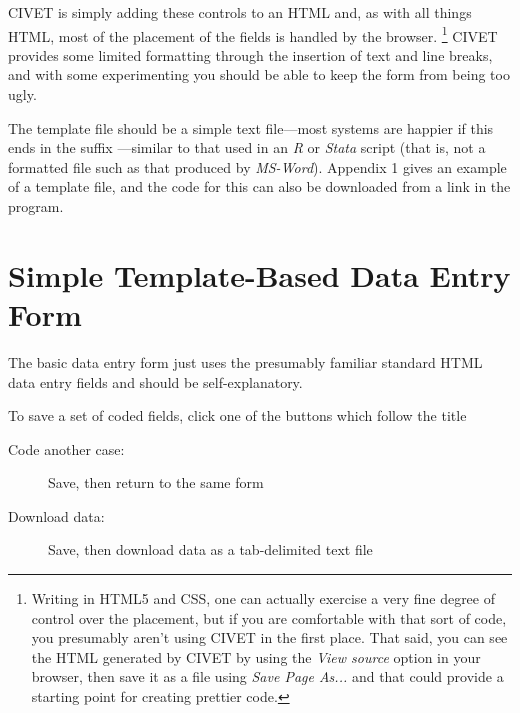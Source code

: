 \documentclass[letterpaper,10pt,english]{sphinxmanual}
\begin{document}
CIVET is simply adding these controls to an HTML  and, as with
all things HTML, most of the placement of the fields is handled by the
browser. \footnote{
Writing in HTML5 and CSS, one can actually exercise a very fine
degree of control over the placement, but if you are comfortable with
that sort of code, you presumably aren’t using CIVET in the first
place. That said, you can see the HTML generated by CIVET by using
the \emph{View source} option in your browser, then save it as a file
using \emph{Save Page As...} and that could provide a starting point for
creating prettier code.
} CIVET provides some limited formatting through the
insertion of text and line breaks, and with some experimenting you
should be able to keep the form from being too ugly.

The template file should be a simple text file—most systems are happier
if this ends in the suffix —similar to that used in an \emph{R}
or \emph{Stata} script (that is, not a formatted file such as that
produced by \emph{MS-Word}). Appendix 1 gives an example of a template
file, and the code for this can also be downloaded from a link in the
program.


\section{Simple Template-Based Data Entry Form}
\label{forms:simple-template-based-data-entry-form}
The basic data entry form just uses the presumably familiar standard
HTML data entry fields and should be self-explanatory.

To save a set of coded fields, click one of the buttons which follow the
title 
\begin{description}
\item[{Code another case:}] \leavevmode
Save, then return to the same form

\item[{Download data:}] \leavevmode
Save, then download data as a tab-delimited text file

\end{description}
\end{document}
